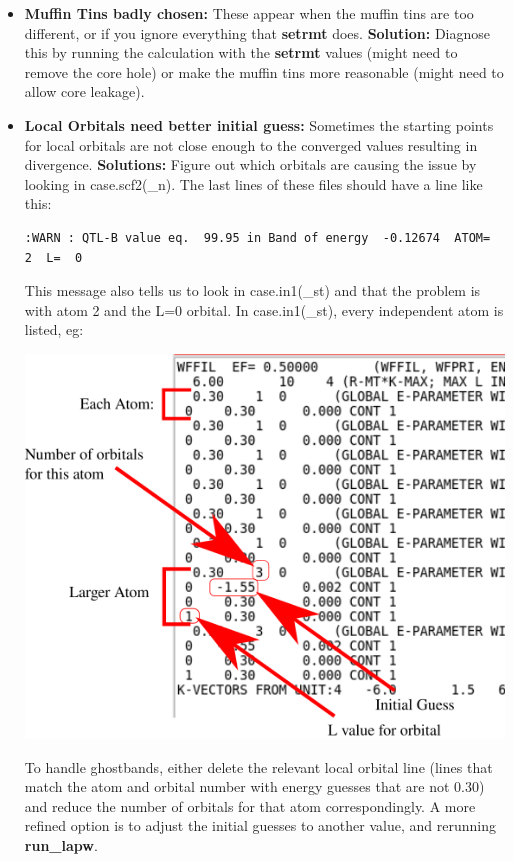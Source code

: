 \documentclass[12pt]{article}
\begin{document}
\begin{itemize}	
	
\item \textbf{Muffin Tins badly chosen:} These appear when the muffin tins are too different, or if you ignore everything that \textbf{setrmt} does.  \textbf{Solution:} Diagnose this by running the calculation with the \textbf{setrmt} values (might need to remove the core hole) or make the muffin tins more reasonable (might need to allow core leakage).

\item  \textbf{Local Orbitals need better initial guess:}  Sometimes the starting points for local orbitals are not close enough to the converged values resulting in divergence.  \textbf{Solutions:} Figure out which orbitals are causing the issue by looking in case.scf2(\_n).  The last lines of these files should have a line like this:  

\begin{lstlisting}
:WARN : QTL-B value eq.  99.95 in Band of energy  -0.12674  ATOM=    2  L=  0
\end{lstlisting}

This message also tells us to look in case.in1(\_st) and that the problem is with atom 2 and the L=0 orbital.  In case.in1(\_st),  every independent atom is listed, eg:

\includegraphics[scale=0.8]{./images/ghostbands.png}




To handle ghostbands, either delete the relevant local orbital line (lines that match the atom and orbital number with energy guesses that are not 0.30) and reduce the number of orbitals for that atom correspondingly.  A more refined option is to adjust the initial guesses to another value, and rerunning \textbf{run\_lapw}.

\end{itemize}
\end{document}
